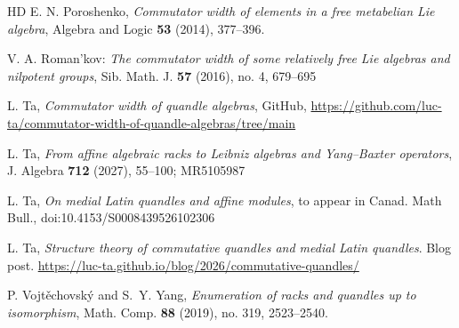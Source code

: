 \documentclass[12 pt]{amsart}
\theoremstyle{definition}
\theoremstyle{remark}
\numberwithin{equation}{section}
\begin{document}
\begin{thebibliography}{HD}
 E. N. Poroshenko, \textit{Commutator width of elements in a free metabelian Lie algebra}, Algebra and Logic {\bf 53} (2014), 377--396.

 V. A. Roman'kov: \textit{The commutator width of some relatively free Lie algebras and nilpotent groups},  Sib. Math. J. {\bf 57} (2016), no. 4, 679--695

 L. Ta, \textit{Commutator width of quandle algebras}, GitHub, \url{https://github.com/luc-ta/commutator-width-of-quandle-algebras/tree/main}

 L. Ta, \textit{From affine algebraic racks to Leibniz algebras and Yang--Baxter operators}, J. Algebra \textbf{712} (2027), 55--100; MR5105987

 L. Ta, \textit{On medial Latin quandles and affine modules}, to appear in Canad. Math Bull., doi:10.4153/S0008439526102306

 L. Ta, \textit{Structure theory of commutative quandles and medial Latin quandles}. Blog post. \url{https://luc-ta.github.io/blog/2026/commutative-quandles/}

 P. Vojt\v echovsk\'y{} and S.~Y. Yang, \emph{Enumeration of racks and quandles up to isomorphism}, Math. Comp. \textbf{88} (2019), no. 319, 2523--2540.

\end{thebibliography}
\end{document}
